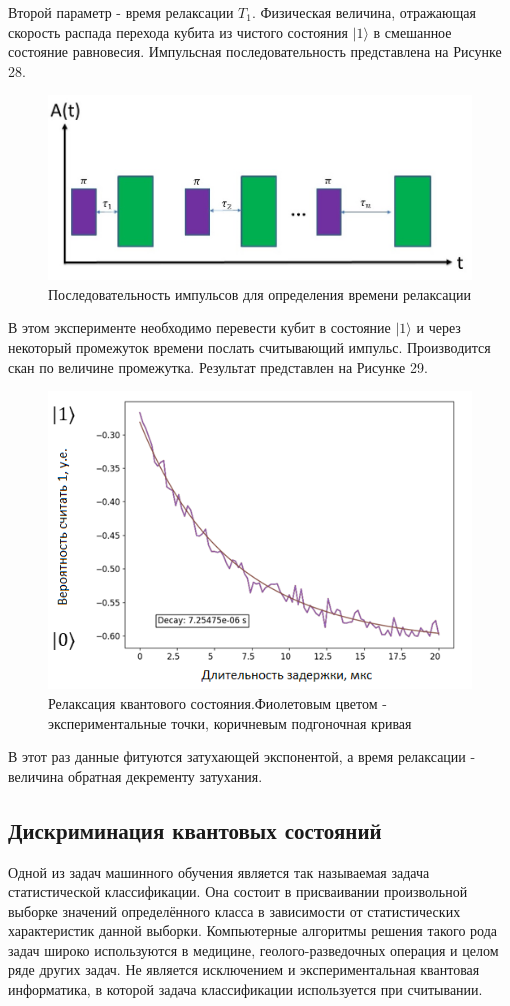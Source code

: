 Второй параметр - время релаксации $T_1$. Физическая величина, отражающая скорость распада перехода кубита из чистого состояния $|1\rangle$ в смешанное состояние равновесия. Импульсная последовательность представлена на Рисунке 28.

\begin{figure}[h]
	\centering
	\includegraphics[width=0.6\linewidth]{pictures/todinpulseseq}
	\caption{Последовательность импульсов для определения времени релаксации}
	\label{fig:todinpulseseq}
\end{figure}

В этом эксперименте необходимо перевести кубит в состояние $|1\rangle$ и через некоторый промежуток времени послать считывающий импульс. Производится скан по величине промежутка. Результат представлен на Рисунке 29.

\begin{figure}[h]
	\centering
	\includegraphics[width=0.7\linewidth]{pictures/t1res.png}
	\caption{Релаксация квантового состояния.Фиолетовым цветом - экспериментальные точки, коричневым подгоночная кривая}
	\label{fig:t1res}
\end{figure}

В этот раз данные фитуются затухающей экспонентой, а время релаксации - величина обратная декременту затухания. 

\subsection {Дискриминация квантовых состояний}\label{discr}
Одной из задач машинного обучения является так называемая задача статистической классификации. Она состоит в присваивании произвольной выборке значений определённого класса в зависимости от статистических характеристик данной выборки. Компьютерные алгоритмы решения такого рода задач широко используются в медицине, геолого-разведочных операция и целом ряде других задач. Не является исключением и экспериментальная квантовая информатика, в которой задача классификации используется при считывании.

